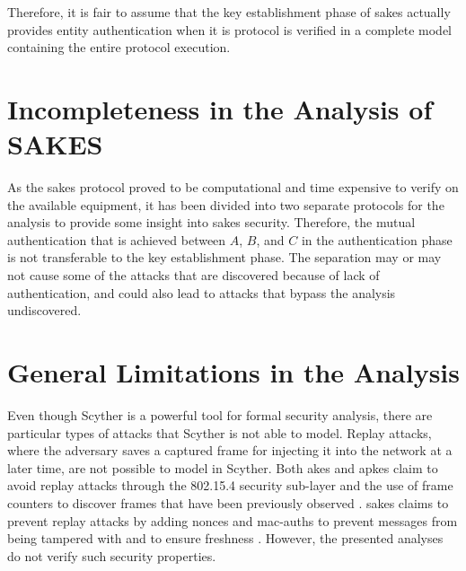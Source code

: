 Therefore, it is fair to assume that the key establishment phase of \gls{sakes} actually provides entity authentication when it is protocol is verified in a complete model containing the entire protocol execution. 


\section{Incompleteness in the Analysis of SAKES}

As the \gls{sakes} protocol proved to be computational and time expensive to verify on the available equipment, it has been divided into two separate protocols for the analysis to provide some insight into \gls{sakes} security. Therefore, the mutual authentication that is achieved between $A$, $B$, and $C$ in the authentication phase is not transferable to the key establishment phase. The separation may or may not cause some of the attacks that are discovered because of lack of authentication, and could also lead to attacks that bypass the analysis undiscovered.

\section{General Limitations in the Analysis}

Even though Scyther is a powerful tool for formal security analysis, there are particular types of attacks that Scyther is not able to model. Replay attacks, where the adversary saves a captured frame for injecting it into the network at a later time, are not possible to model in Scyther. Both \gls{akes} and \gls{apkes} claim to avoid replay attacks through the 802.15.4 security sub-layer and the use of frame counters to discover frames that have been previously observed \cite{krentz2015handling, krentz20136lowpan}. \gls{sakes} claims to prevent replay attacks by adding nonces and \gls{mac-auth}s to prevent messages from being tampered with and to ensure freshness \cite{hussen2013sakes}. However, the presented analyses do not verify such security properties.








